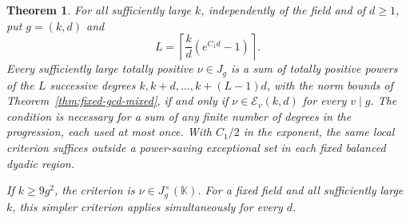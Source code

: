 \documentclass[11pt,letterpaper]{article}
\newtheorem{theorem}{Theorem}[section]
\theoremstyle{definition}
\numberwithin{equation}{section}
\begin{document}
\begin{theorem}\label{thm:uniform-mixed-criterion}
For all sufficiently large $k$, independently of the field and of
$d\ge1$, put $g=(k,d)$ and
\[
                      L=\left\lceil\frac{k}{d}
                              (e^{C_1d}-1)\right\rceil .
\]
Every sufficiently large totally positive $\nu\in J_g$ is a sum of
totally positive powers of the $L$ successive degrees
$k,k+d,\ldots,k+(L-1)d$, with the norm bounds of
Theorem~\ref{thm:fixed-gcd-mixed}, if and only if
$\nu\in\mathcal E_v(k,d)$ for every $v\mid g$. The condition is
necessary for a sum of any finite number of degrees in the
progression, each used at most once. With $C_1/2$ in the exponent,
the same local criterion suffices outside a power-saving exceptional
set in each fixed balanced dyadic region.

If $k\ge9g^2$, the criterion is $\nu\in J_g^\times(\mathbb K)$.
For a fixed field and all sufficiently large $k$, this simpler
criterion applies simultaneously for every $d$.
\end{theorem}
\end{document}
